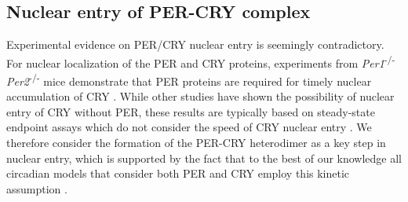 \subsection{Nuclear entry of PER-CRY complex}

Experimental evidence on PER/CRY nuclear entry is seemingly contradictory. 
For nuclear localization of the PER and CRY proteins, experiments from {\it Per1}\textsuperscript{-/-} {\it Per2}\textsuperscript{-/-} mice demonstrate that PER proteins are required for timely nuclear accumulation of CRY \cite{Lee2001}. 
While other studies have shown the possibility of nuclear entry of CRY without PER, these results are typically based on steady-state endpoint assays which do not consider the speed of CRY nuclear entry \cite{Ye2011, Kume1999, Yagita2002}. 
We therefore consider the formation of the PER-CRY heterodimer as a key step in nuclear entry, which is supported by the fact that to the best of our knowledge all circadian models that consider both PER and CRY employ this kinetic assumption \cite{Hirota2012, Relogio2011, Leloup2003, Forger2003, Mirsky2009}.

